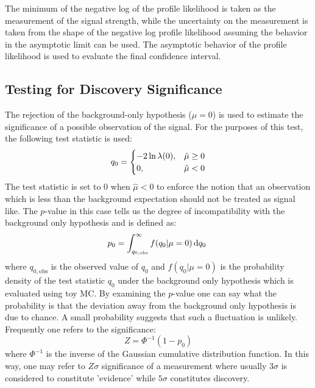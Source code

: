 The minimum of the negative log of the profile likelihood 
is taken as the measurement of the signal strength, while
the uncertainty on the measurement is taken from the shape of the 
negative log profile likelihood assuming the behavior in the asymptotic
limit can be used.  The asymptotic behavior of the profile likelihood 
is used to evaluate the final confidence interval. 


\subsection{Testing for Discovery Significance}
The rejection of the background-only hypothesis ($\mu = 0$) is used 
to estimate the significance of a possible observation of the signal.
For the purposes of this test, the following test 
statistic is used:
\begin{equation}
q_{0} = 
\begin{cases}
\hfill -2 \ln \lambda(0),\hfill & \hat{\mu} \geq 0 \\
0,\hfill & \hat{\mu} < 0
\end{cases}
\label{eq:q0}
\end{equation}
The test statistic is set to $0$ when $\hat{\mu} < 0$ to enforce
the notion that an observation which is less than the background
expectation should not be treated as signal like. The $p$-value in this case
tells us the degree of incompatibility with the background only hypothesis
and is defined as:
\begin{equation}
p_0=\int^{\infty }_{q_{0,\textrm{obs}}} f(q_0|\mu=0) \mathop{}\!\mathrm{d}q_0~
\label{eq:pvalue}
\end{equation}
where $q_{0,\textrm{obs}}$ is the observed value of $q_0$ and 
$f(q_0|\mu=0)$ is the probability density of the test statistic $q_0$ under
the background only hypothesis which is evaluated using toy MC. %
By examining the $p$-value one can say what the probability is 
that the deviation away from the background only hypothesis is due
to chance. A small probability suggests that such a fluctuation is
unlikely. Frequently one refers to the significance:
\begin{equation}
Z = \Phi^{-1}(1-p_0)
\label{eq:significance}
\end{equation}
where $\Phi^{-1}$ is the inverse of the Gaussian cumulative distribution 
function.
In this way, one may refer to $Z\sigma$ significance of a measurement 
where usually
$3\sigma$ is considered to constitute 'evidence' while $5\sigma$ constitutes
discovery.

